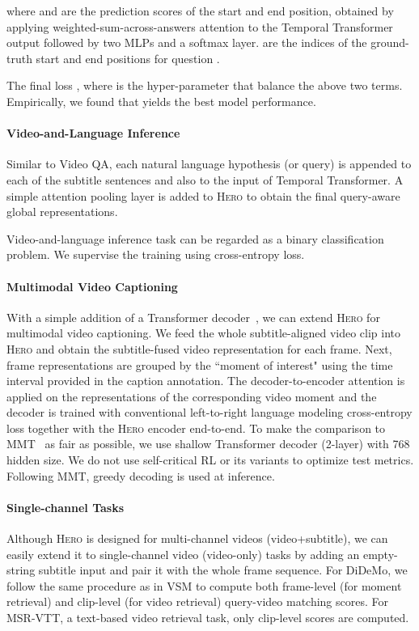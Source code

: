 \documentclass[11pt,a4paper]{article}
\begin{document}
where  and  are the prediction scores of the start and end position,  obtained by applying weighted-sum-across-answers attention to the Temporal Transformer output followed by two MLPs and a softmax layer.  are the indices of the ground-truth start and end positions for question . 

The final loss , where  is the hyper-parameter that balance the above two terms. Empirically, we found that  yields the best model performance. 


\paragraph {Video-and-Language Inference} Similar to Video QA, each natural language hypothesis (or query) is appended to each of the subtitle sentences and also to the input of Temporal Transformer. A simple attention pooling layer is added to \textsc{Hero} to obtain the final query-aware global representations.

Video-and-language inference task can be regarded as a binary classification problem. We supervise the training using cross-entropy loss. 

\paragraph{Multimodal Video Captioning}
With a simple addition of a Transformer decoder~\citep{vaswani2017attention}, we can extend \textsc{Hero} for multimodal video captioning.
We feed the whole subtitle-aligned video clip into \textsc{Hero} and obtain the subtitle-fused video representation for each frame.
Next, frame representations are grouped by the ``moment of interest" using the time interval provided in the caption annotation.
The decoder-to-encoder attention is applied on the representations of the corresponding video moment and the decoder is trained with conventional left-to-right language modeling cross-entropy loss together with the \textsc{Hero} encoder end-to-end.
To make the comparison to MMT~\citep{lei2020tvr} as fair as possible, we use shallow Transformer decoder (2-layer) with 768 hidden size.
We do not use self-critical RL or its variants to optimize test metrics.
Following MMT, greedy decoding is used at inference.

\paragraph{Single-channel Tasks} 
Although \textsc{Hero} is designed for multi-channel videos (video+subtitle), we can easily extend it to single-channel video (video-only) tasks by adding an empty-string subtitle input and  pair it with the whole frame sequence. For DiDeMo, we follow the same procedure as in VSM to compute both frame-level (for moment retrieval) and  clip-level (for video retrieval) query-video matching scores. For MSR-VTT, a text-based video retrieval task, only clip-level scores are computed. 
\end{document}
